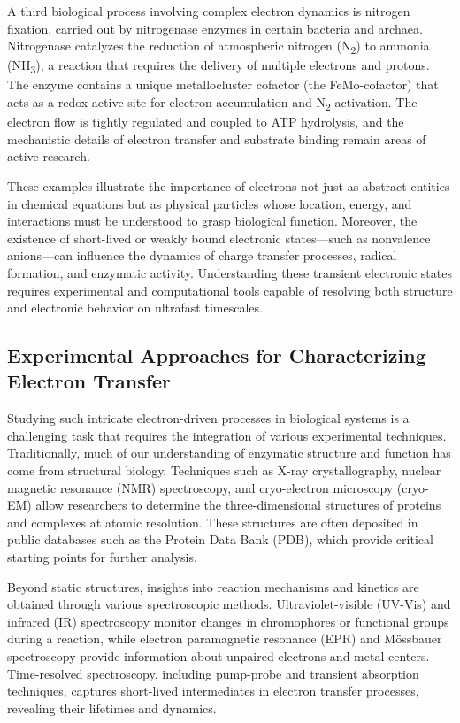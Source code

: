 A third biological process involving complex electron dynamics is nitrogen fixation, carried out by nitrogenase enzymes in certain bacteria and archaea. Nitrogenase catalyzes the reduction of atmospheric nitrogen (N\textsubscript{2}) to ammonia (NH\textsubscript{3}), a reaction that requires the delivery of multiple electrons and protons. The enzyme contains a unique metallocluster cofactor (the FeMo-cofactor) that acts as a redox-active site for electron accumulation and N\textsubscript{2} activation. The electron flow is tightly regulated and coupled to ATP hydrolysis, and the mechanistic details of electron transfer and substrate binding remain areas of active research.

These examples illustrate the importance of electrons not just as abstract entities in chemical equations but as physical particles whose location, energy, and interactions must be understood to grasp biological function. Moreover, the existence of short-lived or weakly bound electronic states—such as nonvalence anions—can influence the dynamics of charge transfer processes, radical formation, and enzymatic activity. Understanding these transient electronic states requires experimental and computational tools capable of resolving both structure and electronic behavior on ultrafast timescales.

\subsection{Experimental Approaches for Characterizing Electron Transfer}

Studying such intricate electron-driven processes in biological systems is a challenging task that requires the integration of various experimental techniques. Traditionally, much of our understanding of enzymatic structure and function has come from structural biology. Techniques such as X-ray crystallography, nuclear magnetic resonance (NMR) spectroscopy, and cryo-electron microscopy (cryo-EM) allow researchers to determine the three-dimensional structures of proteins and complexes at atomic resolution. These structures are often deposited in public databases such as the Protein Data Bank (PDB), which provide critical starting points for further analysis.

Beyond static structures, insights into reaction mechanisms and kinetics are obtained through various spectroscopic methods. Ultraviolet-visible (UV-Vis) and infrared (IR) spectroscopy monitor changes in chromophores or functional groups during a reaction, while electron paramagnetic resonance (EPR) and Mössbauer spectroscopy provide information about unpaired electrons and metal centers. Time-resolved spectroscopy, including pump-probe and transient absorption techniques, captures short-lived intermediates in electron transfer processes, revealing their lifetimes and dynamics.


